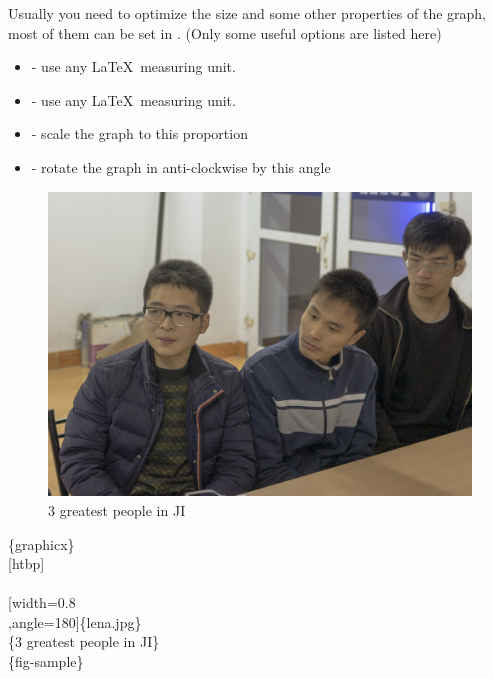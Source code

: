 \begin{frame}
	Usually you need to optimize the size and some other properties of the graph, most of them can be set in . (Only some useful options are listed here)
	\begin{itemize}
		\item {} - use any \LaTeX\ measuring unit.
		\item {} - use any \LaTeX\ measuring unit.
		\item {} - scale the graph to this proportion
		\item {} - rotate the graph in anti-clockwise by this angle 
	\end{itemize}
	\begin{minipage}{0.45\linewidth}
		\begin{example}
			\begin{figure}[htbp]
				\centering
				\includegraphics[width=0.8\linewidth,angle=180]{img/sample.jpg}
				\caption{3 greatest people in JI}
				\label{fig-sample}		
			\end{figure}
		\end{example}
	\end{minipage}
	\hfill
	\begin{minipage}{0.5\linewidth}
		\{graphicx\}\\
		\\
		\phantom{\qquad}\\
		\phantom{\qquad}[width=0.8\\
		,angle=180]\{lena.jpg\}\\
		\phantom{\qquad}\{3 greatest people in JI\}\\
		\phantom{\qquad}\{fig-sample\}\\
	\end{minipage}
\end{frame}

